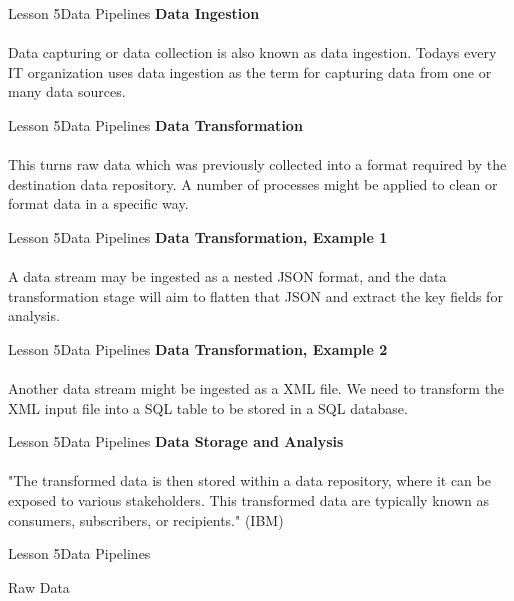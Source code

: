 \documentclass[aspectratio=1610]{beamer}
\begin{document}
\begin{frame}{Lesson 5}{Data Pipelines}
\LARGE
\textbf{Data Ingestion}\\~\\
Data capturing or data collection is also known as data ingestion. Todays every 
IT organization uses data ingestion as the term for capturing data from one or 
many data sources. 
\end{frame}



\begin{frame}{Lesson 5}{Data Pipelines}
\LARGE
\textbf{Data Transformation}\\~\\
This turns raw data which was previously collected into a format required by 
the destination data repository. A number of processes might be applied to 
clean or format data in a specific way.
\end{frame}



\begin{frame}{Lesson 5}{Data Pipelines}
\LARGE
\textbf{Data Transformation, Example 1}\\~\\
A data stream may be ingested as a nested JSON format, and the data 
transformation stage will aim to flatten that JSON and extract the
key fields for analysis.
\end{frame}


\begin{frame}{Lesson 5}{Data Pipelines}
\LARGE
\textbf{Data Transformation, Example 2}\\~\\
Another data stream might be ingested as a XML file. We need to 
transform the XML input file into a SQL table to be stored in a SQL
database.
\end{frame}



\begin{frame}{Lesson 5}{Data Pipelines}
\LARGE
\textbf{Data Storage and Analysis}\\~\\
"The transformed data is then stored within a data repository, where
it can be exposed to various stakeholders. This transformed data are
typically known as consumers, subscribers, or recipients." (IBM)
\end{frame}



\begin{frame}{Lesson 5}{Data Pipelines}
\Huge
\begin{center}
Raw Data
\end{center}
\end{frame}
\end{document}
